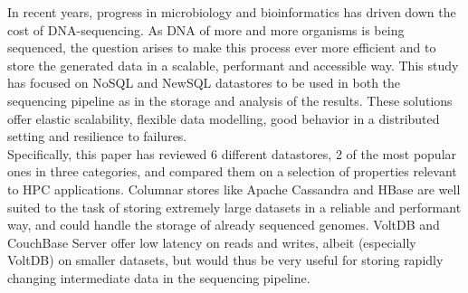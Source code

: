 \documentclass{IEEEtran}
\begin{document}
In recent years, progress in microbiology and bioinformatics has driven down the cost of DNA-sequencing. As DNA of more and more organisms is being sequenced, the question arises to make this process ever more efficient and to store the generated data in a scalable, performant and accessible way. This study has focused on NoSQL and NewSQL datastores to be used in both the sequencing pipeline as in the storage and analysis of the results. These solutions offer elastic scalability, flexible data modelling, good behavior in a distributed setting and resilience to failures.\\
Specifically, this paper has reviewed 6 different datastores, 2 of the most popular ones in three categories, and compared them on a selection of properties relevant to HPC applications. Columnar stores like Apache Cassandra and HBase are well suited to the task of storing extremely large datasets in a reliable and performant way, and could handle the storage of already sequenced genomes. VoltDB and CouchBase Server offer low latency on reads and writes, albeit (especially VoltDB) on smaller datasets, but would thus be very useful for storing rapidly changing intermediate data in the sequencing pipeline. %

{}

\end{document}
